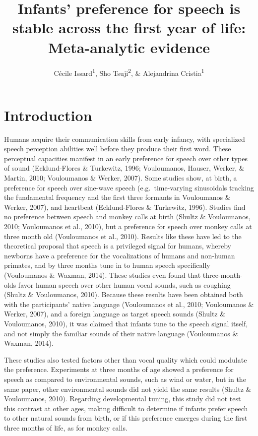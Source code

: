 \documentclass[
  man,mask,floatsintext]{apa6}
\title{Infants' preference for speech is stable across the first year of life: Meta-analytic evidence}
\author{Cécile Issard\textsuperscript{1}, Sho Tsuji\textsuperscript{2}, \& Alejandrina Cristia\textsuperscript{1}}
\date{}
\affiliation{\vspace{0.5cm}\textsuperscript{1} Laboratoire de Sciences Cognitives et Psycholinguistique, Ecole Normale Supérieure, Département d'Études Cognitives\\\textsuperscript{2} International Research Center for Neurointelligence, The University of Tokyo}
\begin{document}
\maketitle

\hypertarget{introduction}{%
\section{Introduction}\label{introduction}}

Humans acquire their communication skills from early infancy, with specialized speech perception abilities well before they produce their first word. These perceptual capacities manifest in an early preference for speech over other types of sound (Ecklund-Flores \& Turkewitz, 1996; Vouloumanos, Hauser, Werker, \& Martin, 2010; Vouloumanos \& Werker, 2007). Some studies show, at birth, a preference for speech over sine-wave speech (e.g.~time-varying sinusoidals tracking the fundamental frequency and the first three formants in Vouloumanos \& Werker, 2007), and heartbeat (Ecklund-Flores \& Turkewitz, 1996). Studies find no preference between speech and monkey calls at birth (Shultz \& Vouloumanos, 2010; Vouloumanos et al., 2010), but a preference for speech over monkey calls at three month old (Vouloumanos et al., 2010). Results like these have led to the theoretical proposal that speech is a privileged signal for humans, whereby newborns have a preference for the vocalizations of humans and non-human primates, and by three months tune in to human speech specifically (Vouloumanos \& Waxman, 2014). These studies even found that three-month-olds favor human speech over other human vocal sounds, such as coughing (Shultz \& Vouloumanos, 2010). Because these results have been obtained both with the participants' native language (Vouloumanos et al., 2010; Vouloumanos \& Werker, 2007), and a foreign language as target speech sounds (Shultz \& Vouloumanos, 2010), it was claimed that infants tune to the speech signal itself, and not simply the familiar sounds of their native language (Vouloumanos \& Waxman, 2014).

These studies also tested factors other than vocal quality which could modulate the preference. Experiments at three months of age showed a preference for speech as compared to environmental sounds, such as wind or water, but in the same paper, other environmental sounds did not yield the same results (Shultz \& Vouloumanos, 2010). Regarding developmental tuning, this study did not test this contrast at other ages, making difficult to determine if infants prefer speech to other natural sounds from birth, or if this preference emerges during the first three months of life, as for monkey calls.
\end{document}
